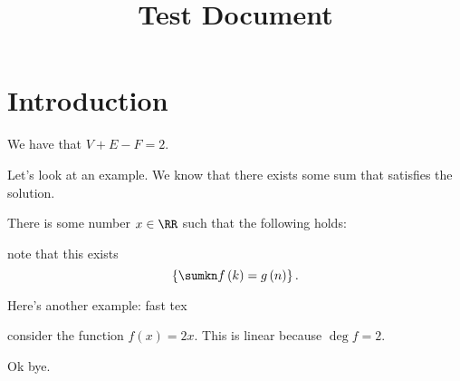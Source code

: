 \documentclass{pranav2}
\title{Test Document}
\begin{document}
 
 \maketitle 

\section{Introduction}

\begin{theorem}{}{}
We have that $V + E - F = 2$.
\end{theorem}

Let's look at an example. We know that there exists some sum that satisfies the solution.

There is some number $x \in \RR$ such that the following holds:

note that this exists
\[ \left \{ \sumkn f\left (k\right ) = g\left (n\right ) \right \}. \]

Here's another example:
fast tex
\begin{example}{}{}
consider the function $f(x) = 2x$. This is linear because $\deg{f} = 2$.
\end{example}

Ok bye.
\end{document}
